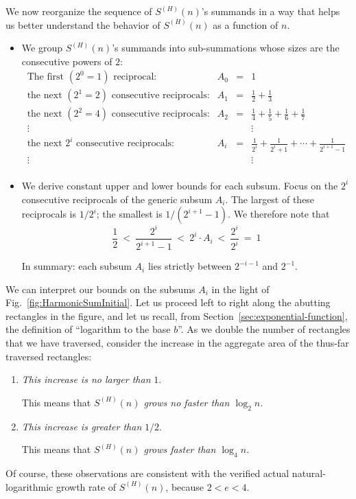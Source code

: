 \medskip

We now reorganize the sequence of $S^{(H)}(n)$'s summands in a way that helps us better understand the behavior of $S^{(H)}(n)$ as a function of $n$.
\begin{itemize}
\item
We group $S^{(H)}(n)$'s summands into sub-summations whose sizes are the consecutive powers of $2$:
\[ \begin{array}{llcl}
\mbox{The first $(2^0 =1)$ reciprocal:} &
A_0 & = &  {\displaystyle 1 } \\[1.01em]
\mbox{the next $(2^1 =2)$ consecutive reciprocals:} &
A_1 & = &  {\displaystyle \frac{1}{2} + \frac{1}{3} }  \\[1.01em]
\mbox{the next $(2^2 =4)$ consecutive reciprocals:} &
A_2 & = &  {\displaystyle \frac{1}{4} + \frac{1}{5} + \frac{1}{6} + \frac{1}{7} } \\
\vdots &  & & \vdots \\
\mbox{the next $2^i$ consecutive reciprocals:} &
A_i & = &  {\displaystyle \frac{1}{2^i} + \frac{1}{2^i+1} + \cdots +
     \frac{1}{2^{i+1}-1}  } \\
\vdots &  & & \vdots \\
\end{array}
\]
\item
We derive constant upper and lower bounds for each subsum.  Focus on the $2^i$ consecutive reciprocals of the generic subsum $A_i$.  The largest of these reciprocals is $1/2^i$; the smallest is $1/(2^{i+1}-1)$.  We therefore note that
\[
\frac{1}{2}
 \ < \
\frac{2^i}{2^{i+1}-1}
 \ < \
2^i \cdot A_i
  \ < \
\frac{2^i}{2^i}
  \ = \ 1
\]

In summary: each subsum $A_i$ lies strictly between $2^{-i-1}$ and $2^{-1}$.
\end{itemize}

We can interpret our bounds on the subsums $A_i$ in the light of Fig.~\ref{fig:HarmonicSumInitial}.   Let us proceed left to right along the abutting rectangles in the figure, and let us recall, from Section~\ref{sec:exponential-function}, the definition of
``logarithm to the base $b$''.  As we double the number of rectangles that we have traversed, consider the increase in the aggregate area of the thus-far traversed rectangles:
\begin{enumerate}
\item
{\em This increase is no larger than} $1$.

\smallskip

This means that {\em $S^{(H)}(n)$ grows no faster than $\log_2 n$.}

\item
{\em This increase is greater than} $1/2$.

\smallskip

This means that {\em $S^{(H)}(n)$ grows faster than $\log_4 n$.}
\end{enumerate}
Of course, these observations are consistent with the verified actual natural-logarithmic growth rate of $S^{(H)}(n)$, because $2 < e < 4$.

